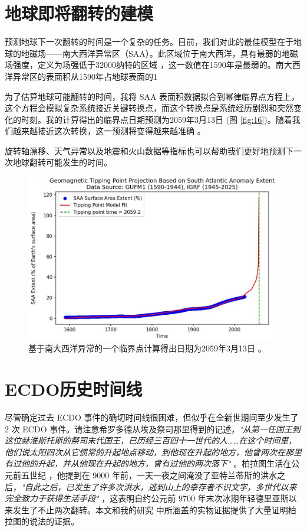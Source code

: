 \documentclass[10pt,twocolumn,letterpaper]{article}
\begin{document}
\section{地球即将翻转的建模}

预测地球下一次翻转的时间是一个复杂的任务。目前，我们对此的最佳模型在于地球的地磁场——南大西洋异常区（SAA）。此区域位于南大西洋，具有最弱的地磁场强度，定义为场强低于32000纳特的区域 \cite{135}，这一数值在1590年是最弱的。南大西洋异常区的表面积从1590年占地球表面的1%

为了估算地球可能翻转的时间，我将 SAA 表面积数据拟合到幂律临界点方程上，这个方程会模拟复杂系统接近关键转换点，而这个转换点是系统经历剧烈和突然变化的时刻。我的计算得出的临界点日期预测为2059年3月13日 (图 \ref{fig:16})。随着我们越来越接近这次转换，这一预测将变得越来越准确 \cite{136}。

旋转轴漂移、天气异常以及地震和火山数据等指标也可以帮助我们更好地预测下一次地球翻转可能发生的时间。

\begin{figure}[t]
\begin{center}
   \includegraphics[width=1\linewidth]{saa-crop.jpeg}
\end{center}
   \caption{基于南大西洋异常的一个临界点计算得出日期为2059年3月13日 \cite{125,126}。}
\label{fig:16}
\label{fig:onecol}
\end{figure}

\section{ECDO历史时间线}

尽管确定过去 ECDO 事件的确切时间线很困难，但似乎在全新世期间至少发生了 2 次 ECDO 事件。请注意希罗多德从埃及祭司那里得到的记述，\textit{"从第一任国王到这位赫淮斯托斯的祭司末代国王，已历经三百四十一世代的人……在这个时间里，他们说太阳四次从它惯常的升起地点移动，到他现在升起的地方，他曾两次在那里有过他的升起，并从他现在升起的地方，曾有过他的两次落下"} \cite{32}。柏拉图生活在公元前五世纪 \cite{111}，他提到在 9000 年前，一天一夜之间淹没了亚特兰蒂斯的洪水之后，\textit{"自此之后，已发生了许多次洪水，逃到山上的幸存者不识文字，多世代以来完全致力于获得生活手段"} \cite{112}，这表明自约公元前 9700 年末次冰期年轻德里亚斯以来发生了不止两次翻转。本文和我的研究 \cite{2} 中所涵盖的实物证据提供了大量证明柏拉图的说法的证据。
\end{document}
